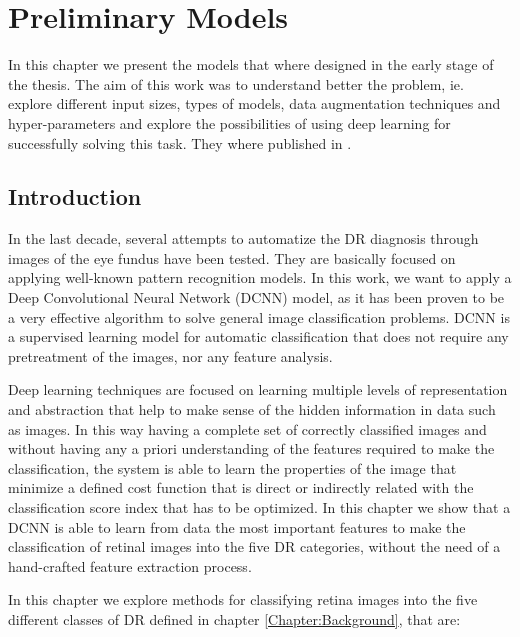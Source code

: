 
\chapter{Preliminary Models} %

\label{Chapter:Classification} %

In this chapter we present the models that where designed in the early stage of the thesis. The aim of this work was to understand better the problem, ie. explore different input sizes, types of models, data augmentation techniques and hyper-parameters and explore the possibilities of using deep learning for successfully solving this task. They where published in \citep{jdelatorre2016}.

\section{Introduction}

In the last decade, several attempts to automatize the DR diagnosis through images of the eye fundus have been tested. They are basically focused on applying well-known pattern recognition models. In this work, we want to apply a Deep Convolutional Neural Network (DCNN) model, as it has been proven to be a very effective algorithm to solve general image classification problems. DCNN is a supervised learning model for automatic classification that does not require any pretreatment of the images, nor any feature analysis. 

Deep learning techniques are focused on learning multiple levels of representation and abstraction that help to make sense of the hidden information in data such as images. In this way having a complete set of correctly classified images and without having any a priori understanding of the features required to make the classification, the system is able to learn the properties of the image that minimize a defined cost function that is direct or indirectly related with the classification score index that has to be optimized.
In this chapter we show that a DCNN is able to learn from data the most important features to make the classification of retinal images into the five DR categories, without the need of a hand-crafted feature extraction process.

In this chapter we explore methods for classifying retina images into the five different classes of DR defined in chapter \ref{Chapter:Background}, that are:

